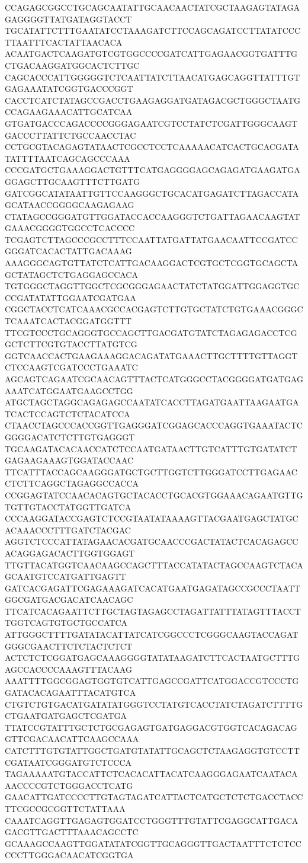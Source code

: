CCAGAGCGGCCTGCAGCAATATTGCAACAACTATCGCTAAGAGTATAGAGAGGGGTTATGATAGGTACCT
TGCATATTCTTTGAATATCCTAAAGATCTTCCAGCAGATCCTTATATCCCTTAATTTCACTATTAACACA
ACAATGACTCAAGATGTCGTGGCCCCGATCATTGAGAACGGTGATTTGCTGACAAGGATGGCACTCTTGC
CAGCACCCATTGGGGGTCTCAATTATCTTAACATGAGCAGGTTATTTGTGAGAAATATCGGTGACCCGGT
CACCTCATCTATAGCCGACCTGAAGAGGATGATAGACGCTGGGCTAATGCCAGAAGAAACATTGCATCAA
GTGATGACCCAGACCCCGGGAGAATCGTCCTATCTCGATTGGGCAAGTGACCCTTATTCTGCCAACCTAC
CCTGCGTACAGAGTATAACTCGCCTCCTCAAAAACATCACTGCACGATATATTTTAATCAGCAGCCCAAA
CCCGATGCTGAAAGGACTGTTTCATGAGGGGAGCAGAGATGAAGATGAGGAGCTTGCAAGTTTCTTGATG
GATCGGCATATAATTGTTCCAAGGGCTGCACATGAGATCTTAGACCATAGCATAACCGGGGCAAGAGAAG
CTATAGCCGGGATGTTGGATACCACCAAGGGTCTGATTAGAACAAGTATGAAACGGGGTGGCCTCACCCC
TCGAGTCTTAGCCCGCCTTTCCAATTATGATTATGAACAATTCCGATCCGGGATCACACTATTGACAAAG
AAAGGGCAGTGTTATCTCATTGACAAGGACTCGTGCTCGGTGCAGCTAGCTATAGCTCTGAGGAGCCACA
TGTGGGCTAGGTTGGCTCGCGGGAGAACTATCTATGGATTGGAGGTGCCCGATATATTGGAATCGATGAA
CGGCTACCTCATCAAACGCCACGAGTCTTGTGCTATCTGTGAAACGGGCTCAAATCACTACGGATGGTTT
TTCGTCCCTGCAGGGTGCCAGCTTGACGATGTATCTAGAGAGACCTCGGCTCTTCGTGTACCTTATGTCG
GGTCAACCACTGAAGAAAGGACAGATATGAAACTTGCTTTTGTTAGGTCTCCAAGTCGATCCCTGAAATC
AGCAGTCAGAATCGCAACAGTTTACTCATGGGCCTACGGGGATGATGAGAAATCATGGAATGAAGCCTGG
ATGCTAGCTAGGCAGAGAGCCAATATCACCTTAGATGAATTAAGAATGATCACTCCAGTCTCTACATCCA
CTAACCTAGCCCACCGGTTGAGGGATCGGAGCACCCAGGTGAAATACTCGGGGACATCTCTTGTGAGGGT
TGCAAGATACACAACCATCTCCAATGATAACTTGTCATTTGTGATATCTGAGAAGAAAGTGGATACCAAC
TTCATTTACCAGCAAGGGATGCTGCTTGGTCTTGGGATCCTTGAGAACCTCTTCAGGCTAGAGGCCACCA
CCGGAGTATCCAACACAGTGCTACACCTGCACGTGGAAACAGAATGTTGTGTTGTACCTATGGTTGATCA
CCCAAGGATACCGAGTCTCCGTAATATAAAAGTTACGAATGAGCTATGCACAAACCCTTTGATCTACGAC
AGGTCTCCCATTATAGAACACGATGCAACCCGACTATACTCACAGAGCCACAGGAGACACTTGGTGGAGT
TTGTTACATGGTCAACAAGCCAGCTTTACCATATACTAGCCAAGTCTACAGCAATGTCCATGATTGAGTT
GATCACGAGATTCGAGAAAGATCACATGAATGAGATAGCCGCCCTAATTGGCGATGACGACATCAACAGC
TTCATCACAGAATTCTTGCTAGTAGAGCCTAGATTATTTATAGTTTACCTTGGTCAGTGTGCTGCCATCA
ATTGGGCTTTTGATATACATTATCATCGGCCCTCGGGCAAGTACCAGATGGGCGAACTTCTCTACTCTCT
ACTCTCTCGGATGAGCAAAGGGGTATATAAGATCTTCACTAATGCTTTGAGCCACCCCAAAGTTTACAAG
AAATTTTGGCGGAGTGGTGTCATTGAGCCGATTCATGGACCGTCCCTGGATACACAGAATTTACATGTCA
CTGTCTGTGACATGATATATGGGTCCTATGTCACCTATCTAGATCTTTTGCTGAATGATGAGCTCGATGA
TTATCCGTATTTGCTCTGCGAGAGTGATGAGGACGTGGTCACAGACAGGTTCGACAACATTCAAGCCAAA
CATCTTTGTGTATTGGCTGATGTATATTGCAGCTCTAAGAGGTGTCCTTCGATAATCGGGATGTCTCCCA
TAGAAAAATGTACCATTCTCACACATTACATCAAGGGAGAATCAATACAAACCCCGTCTGGGACCTCATG
GAACATTGATCCCCTTGTAGTAGATCATTACTCATGCTCTCTGACCTACCTTCGCCGCGGTTCTATTAAA
CAAATCAGGTTGAGAGTGGATCCTGGGTTTGTATTCGAGGCATTGACAGACGTTGACTTTAAACAGCCTC
GCAAAGCCAAGTTGGATATATCGGTTGCAGGGTTGACTAATTTCTCTCCCCCTTGGGACAACATCGGTGA
